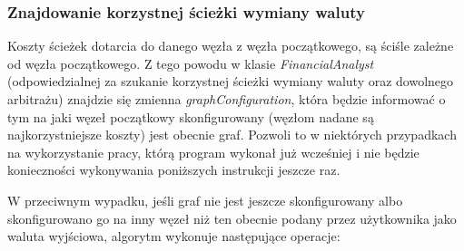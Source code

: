 \documentclass[a4paper,11pt]{article}
\begin{document}
\subsubsection{Znajdowanie korzystnej ścieżki wymiany waluty}
Koszty ścieżek dotarcia do danego węzła z węzła początkowego, są ściśle zależne od węzła początkowego. Z tego powodu w klasie \textit{FinancialAnalyst} (odpowiedzialnej za szukanie korzystnej ścieżki wymiany waluty oraz dowolnego arbitrażu) znajdzie się zmienna \textit{graphConfiguration}, która będzie informować o tym na jaki węzeł początkowy skonfigurowany (węzłom nadane są najkorzystniejsze koszty) jest obecnie graf. Pozwoli to w niektórych przypadkach na wykorzystanie pracy, którą program wykonał już wcześniej i nie będzie konieczności wykonywania poniższych instrukcji jeszcze raz.

W przeciwnym wypadku, jeśli graf nie jest jeszcze skonfigurowany albo skonfigurowano go na inny węzeł niż ten obecnie podany przez użytkownika jako waluta wyjściowa, algorytm wykonuje następujące operacje:
\end{document}
